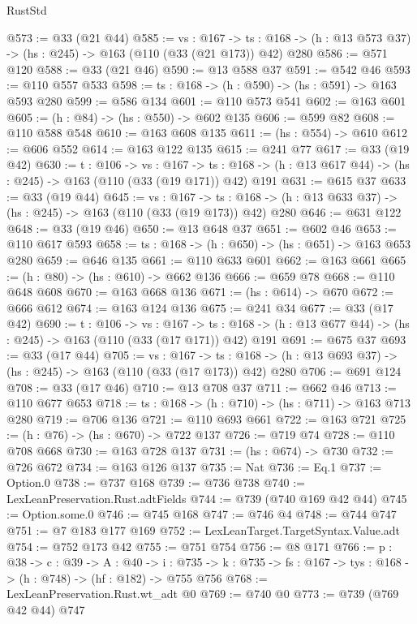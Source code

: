 \begin{lexlean}{RustStd}
\begin{coremodule}
@573 := @33 (@21 @44)
@585 := {vs : @167} ->
  {ts : @168} -> (h : @13 @573 @37) -> (hs : @245) -> @163 (@110 (@33 (@21 @173)) @42) @280
@586 := @571 @120
@588 := @33 (@21 @46)
@590 := @13 @588 @37
@591 := @542 @46
@593 := @110 @557 @533
@598 := {ts : @168} -> (h : @590) -> (hs : @591) -> @163 @593 @280
@599 := @586 @134
@601 := @110 @573 @541
@602 := @163 @601
@605 := (h : @84) -> (hs : @550) -> @602 @135
@606 := @599 @82
@608 := @110 @588 @548
@610 := @163 @608 @135
@611 := (hs : @554) -> @610
@612 := @606 @552
@614 := @163 @122 @135
@615 := @241 @77
@617 := @33 (@19 @42)
@630 := {t : @106} ->
  {vs : @167} ->
  {ts : @168} -> (h : @13 @617 @44) -> (hs : @245) -> @163 (@110 (@33 (@19 @171)) @42) @191
@631 := @615 @37
@633 := @33 (@19 @44)
@645 := {vs : @167} ->
  {ts : @168} -> (h : @13 @633 @37) -> (hs : @245) -> @163 (@110 (@33 (@19 @173)) @42) @280
@646 := @631 @122
@648 := @33 (@19 @46)
@650 := @13 @648 @37
@651 := @602 @46
@653 := @110 @617 @593
@658 := {ts : @168} -> (h : @650) -> (hs : @651) -> @163 @653 @280
@659 := @646 @135
@661 := @110 @633 @601
@662 := @163 @661
@665 := (h : @80) -> (hs : @610) -> @662 @136
@666 := @659 @78
@668 := @110 @648 @608
@670 := @163 @668 @136
@671 := (hs : @614) -> @670
@672 := @666 @612
@674 := @163 @124 @136
@675 := @241 @34
@677 := @33 (@17 @42)
@690 := {t : @106} ->
  {vs : @167} ->
  {ts : @168} -> (h : @13 @677 @44) -> (hs : @245) -> @163 (@110 (@33 (@17 @171)) @42) @191
@691 := @675 @37
@693 := @33 (@17 @44)
@705 := {vs : @167} ->
  {ts : @168} -> (h : @13 @693 @37) -> (hs : @245) -> @163 (@110 (@33 (@17 @173)) @42) @280
@706 := @691 @124
@708 := @33 (@17 @46)
@710 := @13 @708 @37
@711 := @662 @46
@713 := @110 @677 @653
@718 := {ts : @168} -> (h : @710) -> (hs : @711) -> @163 @713 @280
@719 := @706 @136
@721 := @110 @693 @661
@722 := @163 @721
@725 := (h : @76) -> (hs : @670) -> @722 @137
@726 := @719 @74
@728 := @110 @708 @668
@730 := @163 @728 @137
@731 := (hs : @674) -> @730
@732 := @726 @672
@734 := @163 @126 @137
@735 := Nat
@736 := Eq.{1}
@737 := Option.{0}
@738 := @737 @168
@739 := @736 @738
@740 := LexLeanPreservation.Rust.adtFields
@744 := @739 (@740 @169 @42 @44)
@745 := Option.some.{0}
@746 := @745 @168
@747 := @746 @4
@748 := @744 @747
@751 := @7 @183 @177 @169
@752 := LexLeanTarget.TargetSyntax.Value.adt
@754 := @752 @173 @42
@755 := @751 @754
@756 := @8 @171
@766 := {p : @38} ->
  {c : @39} ->
  {A : @40} ->
  {i : @735} -> {k : @735} -> {fs : @167} -> {tys : @168} -> (h : @748) -> (hf : @182) -> @755 @756
@768 := LexLeanPreservation.Rust.wt_adt @0
@769 := @740 @0
@773 := @739 (@769 @42 @44) @747

\end{coremodule}
\end{lexlean}
